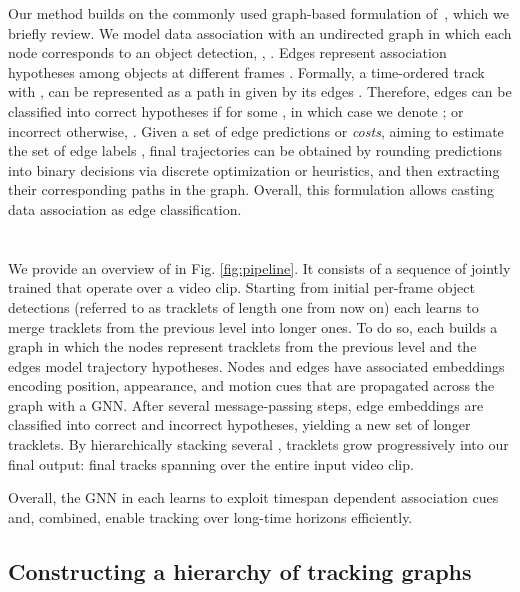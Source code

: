 \documentclass[10pt,twocolumn,letterpaper]{article}
\begin{document}
{{ Our method builds on the commonly used graph-based formulation of~\cite{network_flows_tracking}, which we briefly review.  
We model data association with an undirected graph  in which each node corresponds to an object detection, \ie, . Edges represent association hypotheses among objects at different frames . 
Formally, a time-ordered track  with , can be represented as a path in  given by its edges . 
Therefore, edges  can be classified into correct hypotheses if  for some , in which case we denote ; or incorrect otherwise, \ie  . 
Given a set of edge predictions or \textit{costs},  aiming to estimate the set of edge labels , final trajectories can be obtained by rounding predictions into binary decisions via discrete optimization or heuristics, and then extracting their corresponding paths in the graph. Overall, this formulation allows casting data association as edge classification. 



\section{\modelname}
\label{sec:method}

We provide an overview of \modelname in Fig. \ref{fig:pipeline}. It consists of a sequence of jointly trained \textit{\blocknameplural} that operate over a video clip.
Starting from initial per-frame object detections (referred to as tracklets of length one from now on) each \blockname learns to merge tracklets from the previous level into longer ones. 
To do so, each \blockname builds a graph in which the nodes represent tracklets from the previous level and the edges model trajectory hypotheses. 
Nodes and edges have associated embeddings encoding position, appearance, and motion cues that are propagated across the graph with a GNN. 
After several message-passing steps, edge embeddings are classified into correct and incorrect hypotheses, yielding a new set of longer tracklets. By hierarchically stacking several \blocknameplural, tracklets grow progressively into our final output: final tracks spanning over the entire  input video clip.


Overall, the GNN in each \blockname learns to exploit timespan dependent association cues and, combined, \blocknameplural enable tracking over long-time horizons efficiently.

\subsection{Constructing a hierarchy of tracking graphs} \label{section:graph_hierarchy}









}}
\end{document}
